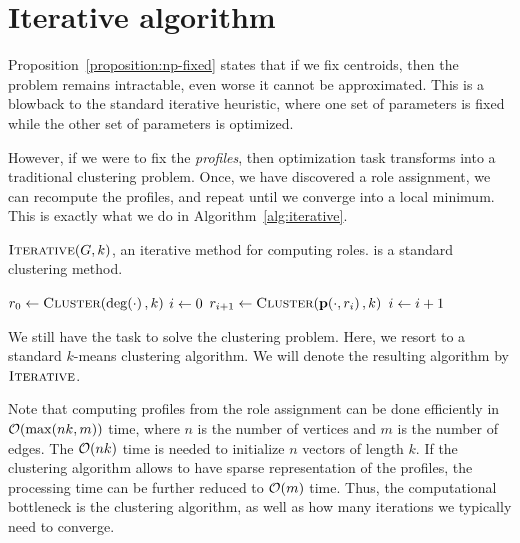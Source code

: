 \section{Iterative algorithm}
\label{sec:kmeans}

Proposition~\ref{proposition:np-fixed} states that if we fix centroids, then
the problem remains intractable, even worse it cannot be approximated. This is
a blowback to the standard iterative heuristic, where one set of parameters is
fixed while the other set of parameters is optimized.

However, if we were to fix the \emph{profiles}, then optimization task
transforms into a traditional clustering problem. Once, we have discovered a
role assignment, we can recompute the profiles, and repeat until we converge
into a local minimum. This is exactly what we do in Algorithm~\ref{alg:iterative}.

\begin{algorithm}
\caption{$\textsc{Iterative}(G, k)$, an iterative method for computing roles.
\algcluster is a standard clustering method.}
\label{alg:iterative}
$r_0 \define \algcluster(\dg{\cdot}, k)$ \;
$i \leftarrow 0$\;
 {
	$r_{i + 1} \define \algcluster(\prof{\cdot, r_i}, k)$ \;
	$i \leftarrow i + 1$\;
}
\end{algorithm}

We still have the task to solve the clustering problem. Here, we resort to a
standard $k$-means clustering algorithm. We will denote the resulting algorithm
by $\textsc{Iterative}$.

Note that computing profiles from the role assignment can be done efficiently
in $\bigO{\max(nk, m)}$ time, where $n$ is the number of vertices and $m$ is
the number of edges. The $\bigO{nk}$ time is needed to initialize $n$ vectors of length $k$.
If the clustering algorithm allows to have sparse representation
of the profiles, the processing time can be further reduced to $\bigO{m}$ time.
Thus, the computational bottleneck is the clustering algorithm, as
well as how many iterations we typically need to converge.
